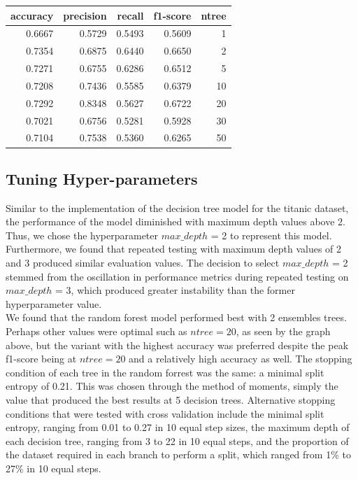 \documentclass{article}
\begin{document}
\begin{center}
    \begin{tabular}{rrrrr}
    \toprule
    accuracy & precision & recall & f1-score & ntree \\
    \midrule
    0.6667 & 0.5729 & 0.5493 & 0.5609 & 1 \\
    0.7354 & 0.6875 & 0.6440 & 0.6650 & 2 \\
    0.7271 & 0.6755 & 0.6286 & 0.6512 & 5 \\
    0.7208 & 0.7436 & 0.5585 & 0.6379 & 10 \\
    0.7292 & 0.8348 & 0.5627 & 0.6722 & 20 \\
    0.7021 & 0.6756 & 0.5281 & 0.5928 & 30 \\
    0.7104 & 0.7538 & 0.5360 & 0.6265 & 50 \\
    \bottomrule
    \end{tabular}
\end{center}
\restoregeometry

\subsection*{Tuning Hyper-parameters}
Similar to the implementation of the decision tree model for the titanic dataset,
the performance of the model diminished with maximum depth values above 2.
Thus, we chose the hyperparameter $max\_depth$ = 2 to represent this model.
Furthermore, we found that repeated testing with maximum depth values of 2 and 3
produced similar evaluation values.
The decision to select $max\_depth$ = 2 stemmed from the oscillation in performance
metrics during repeated testing on $max\_depth$ = 3, 
which produced greater instability than the former hyperparameter value. 
\\

We found that the random forest model performed best with 2 ensembles trees. Perhaps other values were optimal such as $ntree = 20$, as seen by the graph above, but
the variant with the highest accuracy was preferred despite the peak f1-score being at $ntree=20$ and a relatively high accuracy as well.
The stopping condition of each tree in the random forrest was the same: a minimal split entropy of 0.21. This was chosen through the method of moments, simply the value that produced the best results at 5 decision trees.
Alternative stopping conditions that were tested with cross validation include the minimal split entropy, ranging from 0.01 to 0.27 in 10 equal step sizes, the maximum depth of each decision tree, ranging from 3 to 22 in 10 equal steps,
and the proportion of the dataset required in each branch to perform a split, which ranged from 1\% to 27\% in 10 equal steps.
\end{document}

